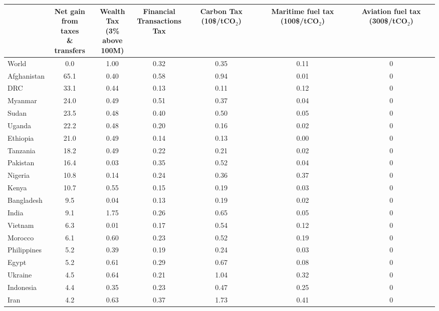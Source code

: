 
\begin{tabular}[t]{lcccccc}
\toprule
  & \makecell{Net gain\\from taxes\\\& transfers} & \makecell{Wealth Tax\\(3\% above\\100M)} & \makecell{Financial\\Transactions\\Tax} & \makecell{Carbon\\Tax\\(10\$/tCO$_\text{2}$)} & \makecell{Maritime\\fuel tax\\(100\$/tCO$_\text{2}$)} & \makecell{Aviation\\fuel tax\\(300\$/tCO$_\text{2}$)}\\
\midrule
World & 0.0 & 1.00 & 0.32 & 0.35 & 0.11 & 0\\
Afghanistan & 65.1 & 0.40 & 0.58 & 0.94 & 0.01 & 0\\
DRC & 33.1 & 0.44 & 0.13 & 0.11 & 0.12 & 0\\
Myanmar & 24.0 & 0.49 & 0.51 & 0.37 & 0.04 & 0\\
Sudan & 23.5 & 0.48 & 0.40 & 0.50 & 0.05 & 0\\
Uganda & 22.2 & 0.48 & 0.20 & 0.16 & 0.02 & 0\\
Ethiopia & 21.0 & 0.49 & 0.14 & 0.13 & 0.00 & 0\\
Tanzania & 18.2 & 0.49 & 0.22 & 0.21 & 0.02 & 0\\
Pakistan & 16.4 & 0.03 & 0.35 & 0.52 & 0.04 & 0\\
Nigeria & 10.8 & 0.14 & 0.24 & 0.36 & 0.37 & 0\\
Kenya & 10.7 & 0.55 & 0.15 & 0.19 & 0.03 & 0\\
Bangladesh & 9.5 & 0.04 & 0.13 & 0.19 & 0.02 & 0\\
India & 9.1 & 1.75 & 0.26 & 0.65 & 0.05 & 0\\
Vietnam & 6.3 & 0.01 & 0.17 & 0.54 & 0.12 & 0\\
Morocco & 6.1 & 0.60 & 0.23 & 0.52 & 0.19 & 0\\
Philippines & 5.2 & 0.39 & 0.19 & 0.24 & 0.03 & 0\\
Egypt & 5.2 & 0.61 & 0.29 & 0.67 & 0.08 & 0\\
Ukraine & 4.5 & 0.64 & 0.21 & 1.04 & 0.32 & 0\\
Indonesia & 4.4 & 0.35 & 0.23 & 0.47 & 0.25 & 0\\
Iran & 4.2 & 0.63 & 0.37 & 1.73 & 0.41 & 0\\

\end{tabular}
